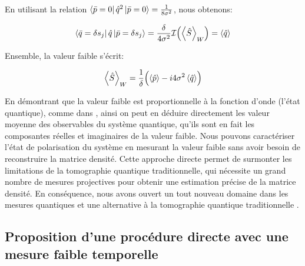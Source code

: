 \begin{onehalfspace}
    \noindent En utilisant la relation $\bra{\bar{p}=0}\hat{q}^2\ket{\bar{p}=0} = \frac{1}{8\sigma^2}$, nous obtenons:

    \begin{align}
        \bra{\bar{q} = \delta s_j}\hat{q}\ket{\bar{p}=\delta s_j} = \frac{\delta}{4\sigma^2}\mathcal{I}\Bigl(\expval{\hat{S}}_W\Bigr) = \expval{\hat{q}}
    \end{align}

    \noindent Ensemble, la valeur faible s'écrit:

    \begin{equation}
        \expval{\hat{S}}_W = \frac{1}{\delta}\Bigl( \expval{\hat{p}} - i4\sigma^2\expval{\hat{q}} \Bigr)
    \end{equation}

    \noindent En démontrant que la valeur faible est proportionnelle à 
    la fonction d’onde (l'état quantique), comme dans 
    \cite{Lundeen_Direct_Measurement,Lundeen_thesis,Lundeen_Resch}, ainsi on peut en déduire directement les 
    valeur moyenne des observables du système quantique, qu'ils sont en fait
    les composantes réelles et imaginaires de la valeur faible. 
    Nous pouvons caractériser l'état de polarisation du
    système en mesurant la valeur faible sans avoir besoin de
    reconstruire la matrice densité.
    Cette approche directe permet de surmonter les limitations de la
    tomographie quantique traditionnelle, qui nécessite un grand nombre
    de mesures projectives pour obtenir une estimation précise de la matrice densité.
    En conséquence, nous avons ouvert un tout nouveau domaine dans les
    mesures quantiques et une alternative à la tomographie quantique
    traditionnelle \cite{Lundeen_Direct_Measurement,Guilleaum}.

\end{onehalfspace}

\subsection{Proposition d'une procédure directe avec une mesure faible temporelle}


